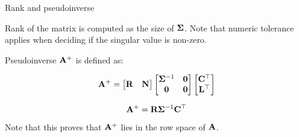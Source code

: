 \documentclass{beamer}
\begin{document}
\begin{frame}{Rank and pseudoinverse}
	\begin{flushleft}
		
		Rank of the matrix is computed as the size of $\mathbf{\Sigma}$. Note that numeric tolerance applies when deciding if the singular value is non-zero.
		
		\bigskip
		
		Pseudoinverse $\mathbf{A}^+$ is defined as:
		
		\begin{equation}
			\mathbf{A}^+ = 
			\begin{bmatrix}
				\mathbf{R} & \mathbf{N}
			\end{bmatrix}
			\begin{bmatrix}
				\mathbf{\Sigma}^{-1} & \mathbf{0} \\
				\mathbf{0} & \mathbf{0}
			\end{bmatrix}
			\begin{bmatrix}
				\mathbf{C}^\top \\ \mathbf{L}^\top
			\end{bmatrix}
		\end{equation}		
		
		\begin{equation}
			\mathbf{A}^+ = 
			\mathbf{R} \mathbf{\Sigma}^{-1} \mathbf{C}^\top
		\end{equation}		
	
	Note that this proves that $\mathbf{A}^+$ lies in the row space of $\mathbf{A}$.
		
	\end{flushleft}
\end{frame}
\end{document}
